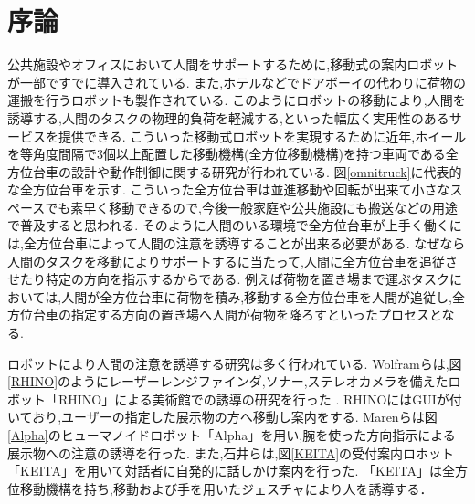 \chapter{序論}

\par
公共施設やオフィスにおいて人間をサポートするために,移動式の案内ロボットが一部ですでに導入されている.
また,ホテルなどでドアボーイの代わりに荷物の運搬を行うロボットも製作されている.
このようにロボットの移動により,人間を誘導する,人間のタスクの物理的負荷を軽減する,といった幅広く実用性のあるサービスを提供できる.
こういった移動式ロボットを実現するために近年,ホイールを等角度間隔で3個以上配置した移動機構(全方位移動機構)を持つ車両である全方位台車の設計や動作制御に関する研究が行われている.
図\ref{omnitruck}に代表的な全方位台車を示す.
こういった全方位台車は並進移動や回転が出来て小さなスペースでも素早く移動できるので,今後一般家庭や公共施設にも搬送などの用途で普及すると思われる.
そのように人間のいる環境で全方位台車が上手く働くには,全方位台車によって人間の注意を誘導することが出来る必要がある.
なぜなら人間のタスクを移動によりサポートするに当たって,人間に全方位台車を追従させたり特定の方向を指示するからである.
例えば荷物を置き場まで運ぶタスクにおいては,人間が全方位台車に荷物を積み,移動する全方位台車を人間が追従し,全方位台車の指定する方向の置き場へ人間が荷物を降ろすといったプロセスとなる.

\begin{comment}
\begin{figure}[!h]
\begin{center}

\texttt{[image: omniwheel.eps]}
\caption{全方位台車の例}
\label{omnitruck}
\end{center}
\end{figure}
\end{comment}

\par
ロボットにより人間の注意を誘導する研究は多く行われている.
Wolframらは,図\ref{RHINO}のようにレーザーレンジファインダ,ソナー,ステレオカメラを備えたロボット「RHINO」による美術館での誘導の研究を行った \cite{Wolfram}.
RHINOにはGUIが付いており,ユーザーの指定した展示物の方へ移動し案内をする.
Marenらは図\ref{Alpha}のヒューマノイドロボット「Alpha」を用い,腕を使った方向指示による展示物への注意の誘導を行った\cite{Maren}.
また,石井らは,図\ref{KEITA}の受付案内ロホット「KEITA」を用いて対話者に自発的に話しかけ案内を行った\cite{Isi}.
「KEITA」は全方位移動機構を持ち,移動および手を用いたジェスチャにより人を誘導する．

\begin{comment}
\begin{figure}[!h]
\begin{center}

\texttt{[image: RHINO.eps]}
\caption{RHINOの画像}
\label{RHINO}
\end{center}
\end{figure}
\end{comment}

